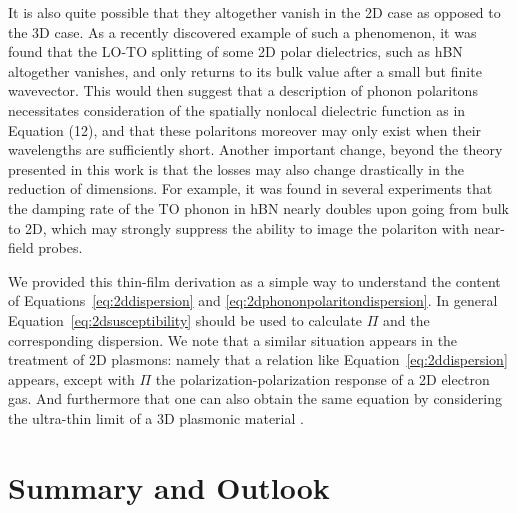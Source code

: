 \documentclass[aps,prb,twocolumn,
	groupedaddress,superscriptaddress,
	amsfonts,amssymb,amsmath,floatfix,
	citeautoscript]{revtex4-1}
\renewcommand{\Im}{\operatorname{Im}}
\renewcommand{\Re}{\operatorname{Re}}
\begin{document}
 It is also quite possible that they altogether vanish in the 2D case as opposed to the 3D case. As a recently discovered example of such a phenomenon, it was found that the LO-TO splitting of some 2D polar dielectrics, such as hBN \cite{sohier2017breakdown} altogether vanishes, and only returns to its bulk value after a small but finite wavevector. This would then suggest that a description of phonon polaritons necessitates consideration of the spatially nonlocal dielectric function as in Equation (12), and that these polaritons moreover may only exist when their wavelengths are sufficiently short. Another important change, beyond the theory presented in this work is that the losses may also change drastically in the reduction of dimensions. For example, it was found in several experiments that the damping rate of the TO phonon in hBN nearly doubles upon going from bulk to 2D\cite{gorbachev2011hunting,tran2016quantum}, which may strongly suppress the ability to image the polariton with near-field probes.


We provided this thin-film derivation as a simple way to understand the content of Equations~\eqref{eq:2ddispersion} and \eqref{eq:2dphononpolaritondispersion}.
In general Equation~\eqref{eq:2dsusceptibility} should be used to calculate $\Pi$ and the corresponding dispersion.
We note that a similar situation appears in the treatment of 2D plasmons: namely that a relation like Equation~\eqref{eq:2ddispersion} appears, except with $\Pi$ the polarization-polarization response of a 2D electron gas.
And furthermore that one can also obtain the same equation by considering the ultra-thin limit of a 3D plasmonic material \cite{jablan2009plasmonics,jablan2013plasmons}.


\section{Summary and Outlook}
\end{document}
